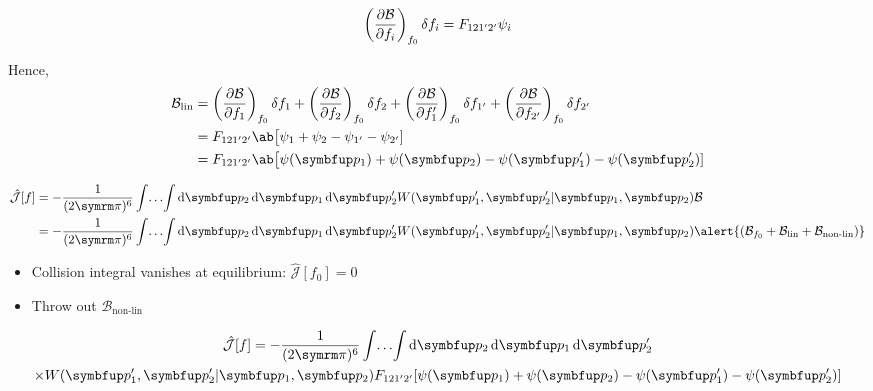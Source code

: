 \begin{frame}
  \begin{blk}{}
    \begin{equation}
      \pdv{\mathcal{B}}{f_i}_{f_0} \fdif{f_i} = F_{121'2'}\psi_i
    \end{equation}
  \end{blk}

  Hence,
  \begin{align}
    \mathcal{B}_{\textrm{lin}}
     & = \pdv{\mathcal{B}}{f_1}_{f_0} \fdif{f_1} + \pdv{\mathcal{B}}{f_2}_{f_0} \fdif{f_2}
    + \pdv{\mathcal{B}}{f_1'}_{f_0} \fdif{f_{1'}} + \pdv{\mathcal{B}}{f_{2'}}_{f_0} \fdif{f_{2'}} \\
     & = F_{121'2'}\ab\big[\psi_1 + \psi_2 - \psi_{1'} - \psi_{2'}]                               \\
     & = F_{121'2'}\ab\big[\psi(\vv{p}_1) + \psi(\vv{p}_2) - \psi(\vv{p}_1') - \psi(\vv{p}_2')]
  \end{align}
\end{frame}

\begin{frame}
  \begin{align}
    \hat{\mathcal{J}}[f]
     & = -\frac{1}{(2\cpi)^6} \dotsint \odif{\vv{p}_2,\vv{p}_1,\vv{p}_2'}
    W(\vv{p}_1', \vv{p}_2'|\vv{p}_1, \vv{p}_2)\mathcal{B}                 \\
     & = -\frac{1}{(2\cpi)^6} \dotsint \odif{\vv{p}_2,\vv{p}_1,\vv{p}_2'}
    W(\vv{p}_1', \vv{p}_2'|\vv{p}_1, \vv{p}_2)
    \alert{(\mathcal{B}_{f_0} + \mathcal{B}_{\textrm{lin}} + \mathcal{B}_{\textrm{non-lin}})}
  \end{align}

  \begin{itemize}
    \item Collision integral vanishes at equilibrium: \(\hat{\mathcal{J}}[f_0] = 0\)
    \item Throw out \(\mathcal{B}_{\textrm{non-lin}}\)
  \end{itemize}

  \begin{blk}{}
    \vspace{-\abovedisplayskip}
    \begin{multline}
      \hat{\mathcal{J}}[f] = -\frac{1}{(2\cpi)^6} \dotsint \odif{\vv{p}_2,\vv{p}_1,\vv{p}_2'} \\
      \times W(\vv{p}_1', \vv{p}_2'|\vv{p}_1, \vv{p}_2) F_{121'2'} [\psi(\vv{p}_1) + \psi(\vv{p}_2) - \psi(\vv{p}_1') - \psi(\vv{p}_2')]
    \end{multline}
  \end{blk}
\end{frame}

